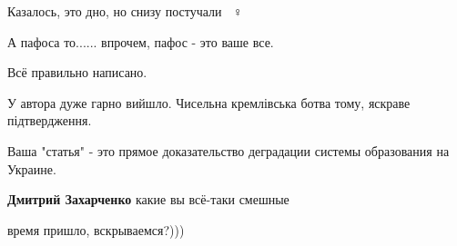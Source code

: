 \begin{itemize}
Казалось, это дно, но снизу постучали 🤦🏽♀️

 
А пафоса то...... впрочем, пафос - это ваше все.

 
Всё правильно написано.

 
У автора дуже гарно вийшло. Чисельна кремлівська ботва тому, яскраве підтвердження.

 
Ваша "статья" - это прямое доказательство деградации системы образования на Украине.

\begin{itemize}
 
\textbf{Дмитрий Захарченко} какие вы всё-таки смешные
\end{itemize}

 
время пришло, вскрываемся?)))

\begin{itemize}
 

\end{itemize}
\end{itemize}
